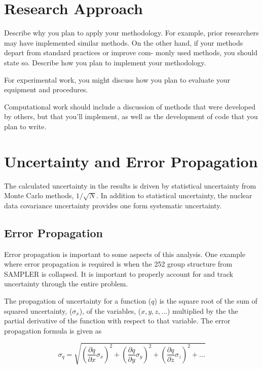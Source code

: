 \section{Research Approach}
Describe why you plan to apply your methodology. For example, prior
researchers may have implemented similar methods. On the other
hand, if your methods depart from standard practices or improve com-
monly used methods, you should state so.
Describe how you plan to implement your methodology.
{ For experimental work, you might discuss how you plan to evaluate
	your equipment and procedures.
	{ Computational work should include a discussion of methods that
		were developed by others, but that you'll implement, as well as
		the development of code that you plan to write.


\section{Uncertainty and Error Propagation}
The calculated uncertainty in the results is driven by statistical uncertainty from Monte Carlo methods, $1/\sqrt{N}$. 
In addition to statistical uncertainty, the nuclear data covariance uncertainty provides one form systematic uncertainty. 

\subsection{Error Propagation}

Error propagation is important to some aspects of this analysis. 
One example where error propagation is required is when the 252 group structure from SAMPLER is collapsed. 
It is important to properly account for and track uncertainty through the entire problem. 

The propagation of uncertainty for a function ($q$) is the square root of the sum of squared uncertainty, ($\sigma_{x}$), of the variables, ($x, y, z,...$) multiplied by the the partial derivative of the function with respect to that variable\cite{Taylor}. 
The error propagation formula is given as

\begin{equation} \label{eq:errprop}
\sigma_{q} = \sqrt{(\dfrac{\partial q}{\partial x} \sigma_{x} )^2+(\dfrac{\partial q}{\partial y} \sigma_{y} )^2+(\dfrac{\partial q}{\partial z} \sigma_{z} )^2+...}
\end{equation}

}}
